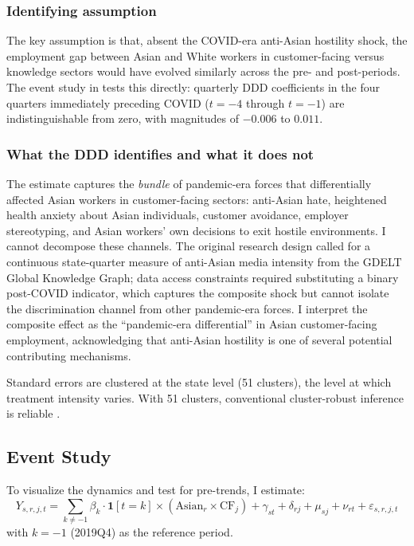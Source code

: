 \documentclass[12pt]{article}
\begin{document}
\subsubsection*{Identifying assumption} The key assumption is that, absent the COVID-era anti-Asian hostility shock, the employment gap between Asian and White workers in customer-facing versus knowledge sectors would have evolved similarly across the pre- and post-periods. The event study in  tests this directly: quarterly DDD coefficients in the four quarters immediately preceding COVID ($t = -4$ through $t = -1$) are indistinguishable from zero, with magnitudes of $-0.006$ to $0.011$.

\subsubsection*{What the DDD identifies and what it does not} The estimate captures the \textit{bundle} of pandemic-era forces that differentially affected Asian workers in customer-facing sectors: anti-Asian hate, heightened health anxiety about Asian individuals, customer avoidance, employer stereotyping, and Asian workers' own decisions to exit hostile environments. I cannot decompose these channels. The original research design called for a continuous state-quarter measure of anti-Asian media intensity from the GDELT Global Knowledge Graph; data access constraints required substituting a binary post-COVID indicator, which captures the composite shock but cannot isolate the discrimination channel from other pandemic-era forces. I interpret the composite effect as the ``pandemic-era differential'' in Asian customer-facing employment, acknowledging that anti-Asian hostility is one of several potential contributing mechanisms.

Standard errors are clustered at the state level (51 clusters), the level at which treatment intensity varies. With 51 clusters, conventional cluster-robust inference is reliable \citep{cameron2008bootstrap}.

\subsection{Event Study}

To visualize the dynamics and test for pre-trends, I estimate:
\begin{equation}
Y_{s,r,j,t} = \sum_{k \neq -1} \beta_k \cdot \mathbf{1}[t = k] \times (\text{Asian}_r \times \text{CF}_j) + \gamma_{st} + \delta_{rj} + \mu_{sj} + \nu_{rt} + \varepsilon_{s,r,j,t}
\label{eq:es}
\end{equation}
with $k = -1$ (2019Q4) as the reference period.
\end{document}
